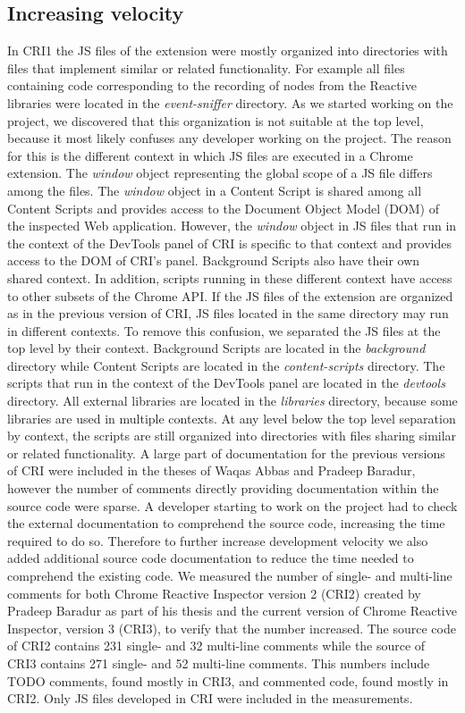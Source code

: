 \subsection{Increasing velocity}
In CRI1 the JS files of the extension were mostly organized into directories with files that implement similar or related functionality. For example all files containing code corresponding to the recording of nodes from the Reactive libraries were located in the \emph{event-sniffer} directory. As we started working on the project, we discovered that this organization is not suitable at the top level, because it most likely confuses any developer working on the project. The reason for this is the different context in which JS files are executed in a Chrome extension. The \emph{window} object representing the global scope of a JS file differs among the files. The \emph{window} object in a Content Script is shared among all Content Scripts and provides access to the Document Object Model (DOM) of the inspected Web application. However, the \emph{window} object in JS files that run in the context of the DevTools panel of CRI is specific to that context and provides access to the DOM of CRI's panel. Background Scripts also have their own shared context. In addition, scripts running in these different context have access to other subsets of the Chrome API. If the JS files of the extension are organized as in the previous version of CRI, JS files located in the same directory may run in different contexts. To remove this confusion, we separated the JS files at the top level by their context. Background Scripts are located in the \emph{background} directory while Content Scripts are located in the \emph{content-scripts} directory. The scripts that run in the context of the DevTools panel are located in the \emph{devtools} directory. All external libraries are located in the \emph{libraries} directory, because some libraries are used in multiple contexts. At any level below the top level separation by context, the scripts are still organized into directories with files sharing similar or related functionality.
A large part of documentation for the previous versions of CRI were included in the theses of Waqas Abbas and Pradeep Baradur, however the number of comments directly providing documentation within the source code were sparse. A developer starting to work on the project had to check the external documentation to comprehend the source code, increasing the time required to do so. Therefore to further increase development velocity we also added additional source code documentation to reduce the time needed to comprehend the existing code. We measured the number of single- and multi-line comments for both Chrome Reactive Inspector version 2 (CRI2) created by Pradeep Baradur as part of his thesis and the current version of Chrome Reactive Inspector, version 3 (CRI3), to verify that the number increased. The source code of CRI2 contains 231 single- and 32 multi-line comments while the source of CRI3 contains 271 single- and 52 multi-line comments. This numbers include TODO comments, found mostly in CRI3, and commented code, found mostly in CRI2. Only JS files developed in CRI were included in the measurements. 
